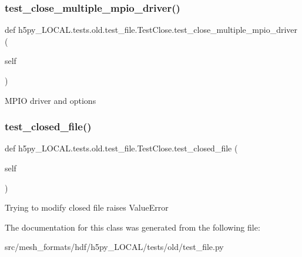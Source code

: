 \subsubsection{\texorpdfstring{test\+\_\+close\+\_\+multiple\+\_\+mpio\+\_\+driver()}{test\_close\_multiple\_mpio\_driver()}}
{\footnotesize\ttfamily def h5py\+\_\+\+L\+O\+C\+A\+L.\+tests.\+old.\+test\+\_\+file.\+Test\+Close.\+test\+\_\+close\+\_\+multiple\+\_\+mpio\+\_\+driver (\begin{DoxyParamCaption}\item[{}]{self }\end{DoxyParamCaption})}

\begin{DoxyVerb}MPIO driver and options \end{DoxyVerb}
 \mbox{\label{classh5py__LOCAL_1_1tests_1_1old_1_1test__file_1_1TestClose_a17a9ad9f2ce4f4d285fb2c0c91b721a2}} 
\subsubsection{\texorpdfstring{test\+\_\+closed\+\_\+file()}{test\_closed\_file()}}
{\footnotesize\ttfamily def h5py\+\_\+\+L\+O\+C\+A\+L.\+tests.\+old.\+test\+\_\+file.\+Test\+Close.\+test\+\_\+closed\+\_\+file (\begin{DoxyParamCaption}\item[{}]{self }\end{DoxyParamCaption})}

\begin{DoxyVerb}Trying to modify closed file raises ValueError \end{DoxyVerb}
 

The documentation for this class was generated from the following file\+:\begin{DoxyCompactItemize}
\item 
src/mesh\+\_\+formats/hdf/h5py\+\_\+\+L\+O\+C\+A\+L/tests/old/test\+\_\+file.\+py\end{DoxyCompactItemize}
